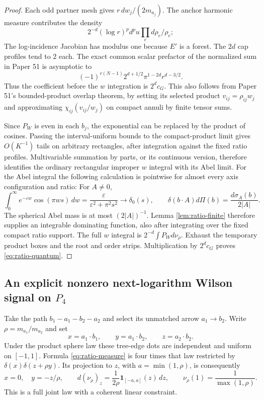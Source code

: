 \begin{proof}
Each odd partner mesh gives $r\,dw_j/(2m_{a_j})$. The anchor harmonic
measure contributes the density
\[
  2^{-d}(\log r)^p d^pu\prod_e d\rho_e/\rho_e;
\]
The log-incidence Jacobian has modulus one because $E'$ is a forest.
The $2d$ cap profiles tend to $2$ each. The exact common scalar
prefactor of the normalized sum in Paper 51 is asymptotic to
\[
 (-1)^{r(N-1)}2^{d+1/2}\pi^{1-2d}r^{d-3/2}.
\]
Thus the coefficient before the $w$ integration is $2^d c_G$.
This also follows from Paper 51's bounded-product overlap theorem,
by setting its selected product $v_{ij}=\rho_{ij}w_j$ and approximating
$\chi_{ij}(v_{ij}/w_j)$ on compact annuli by finite tensor sums.

Since $P_W$ is even in each $b_j$, the exponential can be replaced
by the product of cosines. Passing the interval-uniform bounds to
the compact-product limit gives $O(K^{-1})$ tails on arbitrary
rectangles, after integration against the fixed ratio profiles.
Multivariable summation by parts, or its continuous version, therefore
identifies the ordinary rectangular improper $w$ integral with its
Abel limit. For the Abel integral the following calculation is
pointwise for almost every axis configuration and ratio:
For $A\ne0$,
\[
 \int_0^\infty e^{-\varepsilon w}\cos(\pi ws)\,dw
      =\frac{\varepsilon}{\varepsilon^2+\pi^2s^2}
      \longrightarrow\delta_0(s),\qquad
 \delta(b\cdot A)d\Pi(b)=\frac{d\sigma_A(b)}{2|A|}.
\]
The spherical Abel mass is at most $(2|A|)^{-1}$. Lemma
\ref{lem:ratio-finite} therefore supplies an integrable dominating
function, also after integrating over the fixed compact ratio support.
The full $w$ integral is $2^{-d}\int P_Wd\nu_\rho$. Exhaust the
temporary product boxes and the root and order strips. Multiplication
by $2^dc_G$ proves \eqref{eq:ratio-quantum}.
\end{proof}

\subsection{An explicit nonzero next-logarithm Wilson signal on \texorpdfstring{$P_4$}{P4}}
Take the path $b_1-a_1-b_2-a_2$ and select its unmatched arrow
$a_1\to b_2$. Write $\rho=m_{a_1}/m_{a_2}$ and set
\[
 x=a_1\cdot b_1,\qquad y=a_1\cdot b_2,\qquad z=a_2\cdot b_2.
\]
Under the product sphere law these tree-edge dots are independent
and uniform on $[-1,1]$. Formula \eqref{eq:ratio-measure} is four
times that law restricted by $\delta(x)\delta(z+\rho y)$.
Its projection to $z$, with $a=\min(1,\rho)$, is consequently
\begin{equation}\label{eq:ratio-p4-law}
 x=0,\quad y=-z/\rho,\qquad
 d(\nu_\rho)_z=\frac1{2\rho}\mathbf1_{[-a,a]}(z)\,dz,
 \qquad \nu_\rho(1)=\frac1{\max(1,\rho)}.
\end{equation}
This is a full joint law with a coherent linear constraint.

